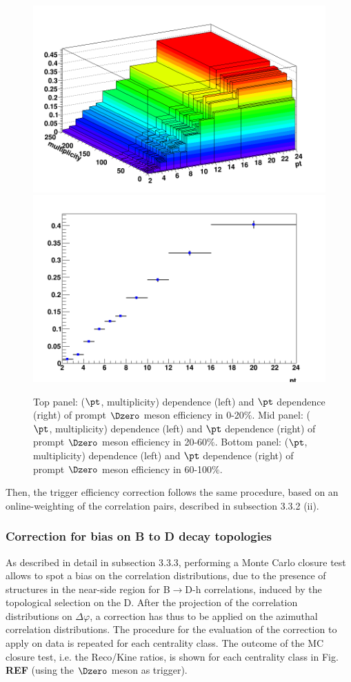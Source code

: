 \begin{figure}[h]
	\includegraphics[width=.48\linewidth]{figuresVsCent/Dzero/EffAndFeed/EfficiencyMap_2D_Dzero_c_RefPtBins_Cuts020_MultWeig_wLimAcc_Plot.png
}
	\includegraphics[width=.48\linewidth]{figuresVsCent/Dzero/EffAndFeed/EfficiencyMap_1D_Dzero_c_RefPtBins_Cuts020_MultWeig_wLimAcc_Plot.png
}
	\caption{Top panel: ($\pt$, multiplicity) dependence (left) and $\pt$ dependence (right) of prompt $\Dzero$ meson efficiency in 0-20$\%$.
Mid panel: ($\pt$, multiplicity) dependence (left) and $\pt$ dependence (right) of prompt $\Dzero$ meson efficiency in 20-60$\%$.
Bottom panel: ($\pt$, multiplicity) dependence (left) and $\pt$ dependence (right) of prompt $\Dzero$ meson efficiency in 60-100$\%$.}
	\label{fig:dzeroEff}	
\end{figure}




Then, the trigger efficiency correction follows the same procedure, based on an online-weighting of the correlation pairs, described in subsection 3.3.2 (ii).

\subsubsection{Correction for bias on B to D decay topologies}
As described in detail in subsection 3.3.3, performing a Monte Carlo closure test allows to spot a bias on the correlation distributions, due to the presence of structures in the near-side region for B$\rightarrow$D-h correlations, induced by the topological selection on the D.
After the projection of the correlation distributions on $\Delta\varphi$, a correction has thus to be applied on the azimuthal correlation distributions. The procedure for the evaluation of the correction to apply on data is repeated for each centrality class.
The outcome of the MC closure test, i.e. the Reco/Kine ratios, is shown for each centrality class in Fig. {\bf REF} (using the $\Dzero$ meson as trigger).



